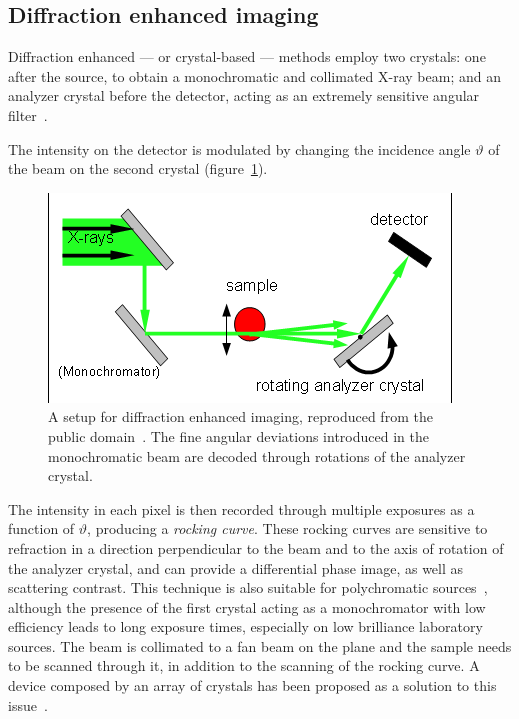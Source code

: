 \subsection{Diffraction enhanced imaging}
Diffraction enhanced --- or crystal-based --- methods employ two crystals:
one after the source, to obtain a monochromatic and collimated X-ray beam;
and an analyzer crystal before the detector, acting as an extremely
sensitive angular filter~\parencite{pmid10751500}.

The intensity on the detector is modulated by changing the incidence angle
$\vartheta$ of the beam on the second crystal (figure~\ref{fig:dei}).
\begin{figure}[htb]
    \centering
    \includegraphics[width=.8\textwidth]{gfx/analyzer-based_imaging.png}
    \caption[Analyzer-based setup.]{A setup for diffraction enhanced
        imaging, reproduced from the public domain~\parencite{analyzer-based-picture}. The fine angular deviations introduced in the
    monochromatic beam are decoded through rotations of the analyzer crystal.}
    \label{fig:dei}
\end{figure}
The intensity in each pixel is then recorded through multiple exposures as a
function of $\vartheta$, producing a \emph{rocking curve}. These rocking
curves are sensitive to refraction in a direction perpendicular to the beam
and to the axis of rotation of the analyzer crystal, and can provide a
differential phase image, as well as scattering contrast. This technique
is also suitable for polychromatic sources~\parencite{doi:
10.1117/12.813669,PARHAM2009911}, although the presence of the
first crystal acting as a monochromator with low efficiency leads to
long exposure times, especially on low brilliance laboratory sources. The
beam is collimated to a fan beam on the plane and the sample needs to
be scanned through it, in addition to the scanning of the rocking curve. A
device composed by an array of crystals has been proposed as a solution to
this issue~\parencite{Connor2014}.

